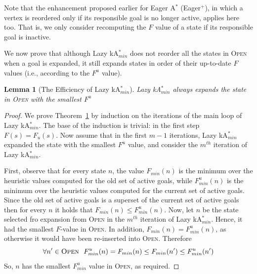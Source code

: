 \documentclass{aicom2e}
\newtheorem{lemma}{Lemma}
\newcommand{\astar}{A$^*$}
\newcommand{\kastarmin}{kA$^*_{min}$}
\newcommand{\open}{\textsc{Open}}
\begin{document}
Note that the enhancement proposed earlier for Eager \astar{} (Eager$^+$), 
in which a vertex is reordered only if its
responsible goal is no longer active, applies here too. That is, we only
consider recomputing the $F$ value of a state if its responsible goal is
inactive.



We now prove that although Lazy \kastarmin{} does not reorder all the states in \open{} 
when a goal is expanded, it still expands states in order of their up-to-date $F$ values (i.e., according to the $F^u$ value). 
\begin{lemma}[The Efficiency of Lazy \kastarmin{}]
Lazy \kastarmin{} always expands the state in \open{} with the smallest $F^u$
\label{the:lazy-minf-correct}
\end{lemma}
\begin{proof}


We prove Theorem~\ref{the:lazy-minf-correct} by induction on the iterations of
the main loop of Lazy \kastarmin{}. 
The base of the induction is trivial: in the first step $F(s)=F_u(s)$. Now assume that in the first $m-1$ iterations, Lazy \kastarmin{} expanded the state with the smallest $F^u$ value, and consider the $m^{th}$ iteration of Lazy \kastarmin{}. 


First, observe that for every state $n$, the value $F_{min}(n)$ is the minimum
over the heuristic values computed for the old set of active goals, while
$F_{min}^u(n)$ is the minimum over the heuristic values computed for the current
set of active goals. Since the old set of active goals is a superset of the
current set of active goals then for every $n$ it holds that $F_{min}(n)\leq
F^u_{min}(n)$.
Now, let $n$ be the state selected fro expansion from \open{} in the $m^{th}$
iteration of Lazy \kastarmin{}. Hence, it had the smallest $F$-value in
\open{}. In addition, $F_{min}(n)=F^u_{min}(n)$, as otherwise it would have
been re-inserted into \open{}. Therefore
\[ \forall n'\in\open{} ~~ F^u_{min}(n)=F_{min}(n)\leq F_{min}(n') \leq F^u_{min}(n') \]
    So, $n$ has the smallest $F^u_{min}$ value in \open{}, as required. 
\end{proof}
\end{document}
